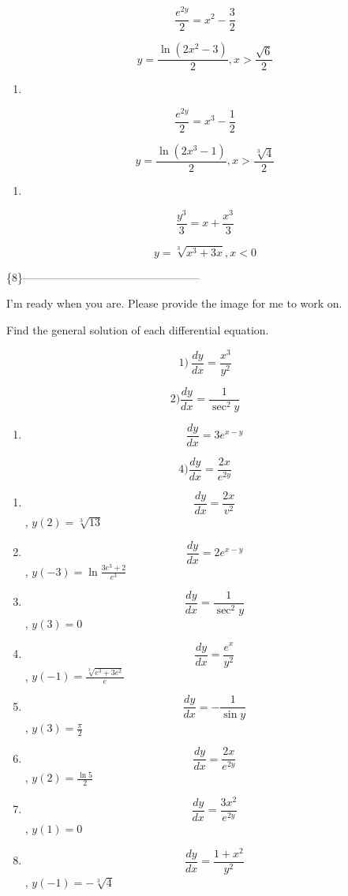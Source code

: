\documentclass[
]{article}
\providecommand{\tightlist}{%
  \setlength{\itemsep}{0pt}\setlength{\parskip}{0pt}}
\begin{document}
\[\frac{e^{2y}}{2} = x^2 - \frac{3}{2}\]

\[y = \frac{\ln(2x^2 - 3)}{2}, x > \frac{\sqrt{6}}{2}\]

\begin{enumerate}
\def\labelenumi{\arabic{enumi})}
\setcounter{enumi}{10}
\tightlist
\item
\end{enumerate}

\[\frac{e^{2y}}{2} = x^3 - \frac{1}{2}\]

\[y = \frac{\ln(2x^3 - 1)}{2}, x > \frac{\sqrt[3]{4}}{2}\]

\begin{enumerate}
\def\labelenumi{\arabic{enumi})}
\setcounter{enumi}{11}
\tightlist
\item
\end{enumerate}

\[\frac{y^3}{3} = x + \frac{x^3}{3}\]

\[y = \sqrt[3]{x^3 + 3x}, x < 0\]

\{8\}------------------------------------------------

I'm ready when you are. Please provide the image for me to work on.

Find the general solution of each differential equation.

\[1) \ \frac{dy}{dx} = \frac{x^3}{y^2}\]

\[2) \frac{dy}{dx} = \frac{1}{\sec^2 y}\]

\begin{enumerate}
\def\labelenumi{\arabic{enumi})}
\setcounter{enumi}{2}
\tightlist
\item
  \[\frac{dy}{dx} = 3e^{x-y}\]
\end{enumerate}

\[4) \frac{dy}{dx} = \frac{2x}{e^{2y}}\]

\begin{enumerate}
\def\labelenumi{\arabic{enumi})}
\setcounter{enumi}{4}
\item
  \[\frac{dy}{dx} = \frac{2x}{v^2}\] , \(y(2) = \sqrt[3]{13}\)
\item
  \[\frac{dy}{dx} = 2e^{x-y}\] , \(y(-3) = \ln \frac{3e^3 + 2}{e^3}\)
\item
  \[\frac{dy}{dx} = \frac{1}{\sec^2 y}\] , \(y(3) = 0\)
\item
  \[\frac{dy}{dx} = \frac{e^x}{y^2}\] ,
  \(y(-1) = \frac{\sqrt[3]{e^3 + 3e^2}}{e}\)
\item
  \[\frac{dy}{dx} = -\frac{1}{\sin y}\] , \(y(3) = \frac{\pi}{2}\)
\item
  \[\frac{dy}{dx} = \frac{2x}{e^{2y}}\] , \(y(2) = \frac{\ln 5}{2}\)
\item
  \[\frac{dy}{dx} = \frac{3x^2}{e^{2y}}\] , \(y(1) = 0\)
\item
  \[\frac{dy}{dx} = \frac{1+x^2}{y^2}\] , \(y(-1) = -\sqrt[3]{4}\)
\end{enumerate}
\end{document}
